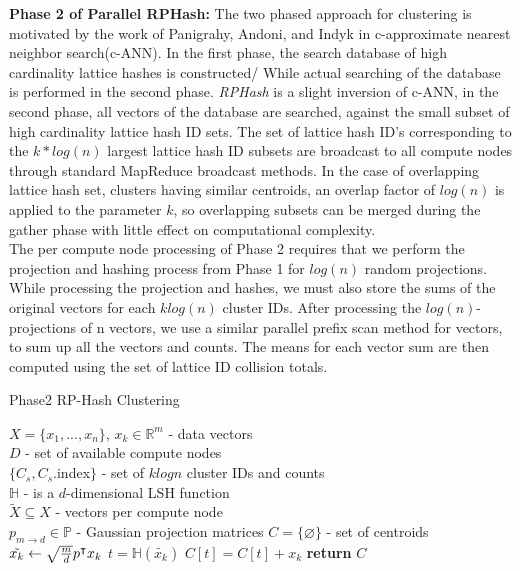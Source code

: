 \documentclass[a4paper,10pt]{article}
\begin{document}
\textbf{Phase 2 of Parallel RPHash: }
The two phased approach for clustering is motivated by the work of Panigrahy,
Andoni, and Indyk \cite{panigrahy}\cite{Andoni}
in c-approximate nearest neighbor search(c-ANN). In the first phase,  the search
database of high cardinality lattice hashes is constructed/
While actual searching of the database is performed in the second phase.
\emph{RPHash} is a slight inversion of c-ANN, in the
second phase, all vectors of the database are searched, against the small subset
of high cardinality lattice hash ID sets.
The set of lattice hash ID's corresponding to the $k*log(n)$ largest lattice
hash ID subsets are broadcast to all compute nodes through standard MapReduce 
broadcast methods. In the case of overlapping lattice hash set, clusters having
similar centroids, an overlap factor of $log(n)$ is applied to the parameter
$k$, so overlapping subsets can be merged during the gather phase with little
effect on computational complexity.\\
The per compute node processing of Phase 2 requires that we perform the
projection and hashing process from Phase 1 for $log(n)$ random projections.
While processing the projection and hashes, we must also store the sums of the
original vectors for each $klog(n)$ cluster IDs. After processing the
$log(n)$-projections of n
vectors, we use a similar parallel prefix scan method for vectors, to sum up all
the vectors and counts. The means for each vector sum
are then computed using the set of lattice ID collision totals.

%
\begin{algorithm}
\caption{Phase2 RP-Hash Clustering}\label{Phase2}
\begin{algorithmic}[1]
\REQUIRE $X=\{x_1,...,x_n\}$, $x_k \in \mathbb{R}^m$ - data vectors\\
$D$ - set of available compute nodes\\
$\{C_s,C_s.$index$\}$ - set of $klogn$ cluster IDs and counts\\
$\mathbb{H}$ - is a $d$-dimensional LSH function\\
$\widetilde{X} \subseteq X$ - vectors per compute node\\
$p_{m\rightarrow d}\in \mathbb{P}$ - Gaussian projection matrices
\STATE $C=\{\varnothing\}$ - set of centroids
\STATE $\tilde{x_k}\leftarrow \sqrt{{m}\over{d}}p^{\intercal}x_k $
\STATE $t = \mathbb{H}(\tilde{x_k})$
\STATE $C[t]=C[t]+x_k$
\ENDIF
\ENDFOR
\ENDFOR
\State \textbf{return} ${C}$
\end{algorithmic}
\end{algorithm}
\end{document}
